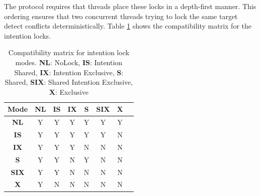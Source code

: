 The protocol requires that threads place these locks in a depth-first manner. This ordering ensures that two concurrent threads trying to lock the same target detect conflicts deterministically. Table \ref{tab:intention_locks} shows the compatibility matrix for the intention locks.



\begin{table}[h]
    \centering
    \captionsetup{justification=centering}
    \begin{tabular}{c|ccccccc}
        \textbf{Mode} & \textbf{NL} & \textbf{IS} & \textbf{IX} & \textbf{S} & \textbf{SIX} & \textbf{X}\\
        \hline
        \textbf{NL} & \cellcolor{green!25} Y & \cellcolor{green!25} Y & \cellcolor{green!25} Y & \cellcolor{green!25} Y & \cellcolor{green!25} Y & \cellcolor{green!25} Y \\
        \textbf{IS} &  \cellcolor{green!25} Y & \cellcolor{green!25} Y & \cellcolor{green!25} Y & \cellcolor{green!25} Y & \cellcolor{green!25} Y & \cellcolor{red!25} N \\
        \textbf{IX} &  \cellcolor{green!25} Y & \cellcolor{green!25} Y & \cellcolor{green!25} Y & \cellcolor{red!25} N & \cellcolor{red!25} N & \cellcolor{red!25} N \\
        \textbf{S} &  \cellcolor{green!25} Y & \cellcolor{green!25} Y & \cellcolor{red!25} N & \cellcolor{green!25} Y & \cellcolor{red!25} N & \cellcolor{red!25} N \\
        \textbf{SIX} &  \cellcolor{green!25} Y & \cellcolor{green!25} Y & \cellcolor{red!25} N & \cellcolor{red!25} N & \cellcolor{red!25} N & \cellcolor{red!25} N \\
        \textbf{X} &  \cellcolor{green!25} Y & \cellcolor{red!25} N & \cellcolor{red!25} N & \cellcolor{red!25} N & \cellcolor{red!25} N & \cellcolor{red!25} N \\
    \end{tabular}
    \caption{Compatibility matrix for intention lock modes. \textbf{NL}: NoLock, \textbf{IS}: Intention Shared, \textbf{IX}: Intention Exclusive, \textbf{S}: Shared, \textbf{SIX}: Shared Intention Exclusive, \textbf{X}: Exclusive}
    \label{tab:intention_locks}
\end{table}



